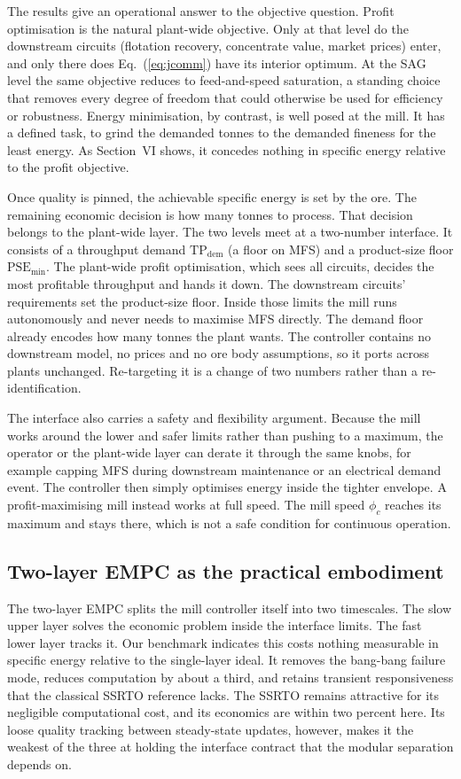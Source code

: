 \documentclass[conference]{IEEEtran}
\begin{document}
The results give an operational answer to the objective question. Profit
optimisation is the natural plant-wide objective. Only at that level do
the downstream circuits (flotation recovery, concentrate value, market
prices) enter, and only there does Eq.~(\ref{eq:jcomm}) have its interior
optimum. At the SAG level the same objective reduces to feed-and-speed
saturation, a standing choice that removes every degree of freedom that
could otherwise be used for efficiency or robustness. Energy
minimisation, by contrast, is well posed at the mill. It has a defined
task, to grind the demanded tonnes to the demanded fineness for the least
energy. As Section~VI shows, it concedes nothing in specific energy
relative to the profit objective.

Once quality is pinned, the achievable specific energy is set by the
ore. The remaining economic decision is how many tonnes to process.
That decision belongs to the plant-wide layer. The two levels meet at a
two-number interface. It consists of a
throughput demand $\mathrm{TP}_{\mathrm{dem}}$ (a floor on MFS) and a
product-size floor $\mathrm{PSE}_{\min}$. The plant-wide profit
optimisation, which sees all circuits, decides the most profitable
throughput and hands it down. The downstream circuits' requirements set
the product-size floor. Inside those limits the mill runs autonomously
and never needs to maximise MFS directly. The demand floor already
encodes how many tonnes the plant wants. The controller contains no
downstream model, no prices and no ore body assumptions, so it ports
across plants unchanged. Re-targeting it is a change of two numbers
rather than a re-identification.

The interface also carries a safety and flexibility argument. Because the
mill works around the lower and safer limits rather than pushing to a
maximum, the operator or the
plant-wide layer can derate it through the same knobs, for example
capping MFS during downstream maintenance or an electrical demand event.
The controller then simply optimises energy inside the tighter envelope.
A profit-maximising mill instead works at full speed. The mill speed
$\phi_c$ reaches its maximum and stays there, which is not a safe
condition for continuous operation.

\subsection{Two-layer EMPC as the practical embodiment}

The two-layer EMPC splits the mill controller itself into two
timescales. The slow upper layer solves the economic problem inside the
interface limits. The fast lower layer tracks it. Our benchmark indicates
this costs nothing measurable in specific energy relative to the
single-layer ideal. It removes the bang-bang failure mode, reduces
computation by about a third, and retains transient responsiveness that
the classical SSRTO reference lacks. The SSRTO remains attractive for its
negligible computational cost, and its economics are within two percent
here. Its loose quality tracking between steady-state updates, however,
makes it the weakest of the three at holding the interface contract that
the modular separation depends on.
\end{document}
